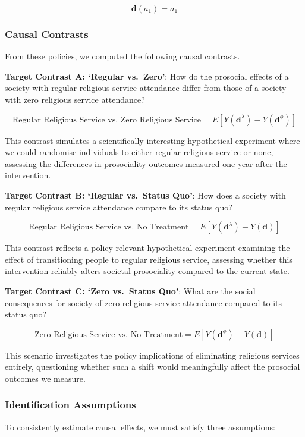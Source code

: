 \documentclass[
  single column]{article}
\begin{document}
\[
\mathbf{d}(a_1) = a_1
\]

\subsubsection{Causal Contrasts}\label{causal-contrasts}

From these policies, we computed the following causal contrasts.

\textbf{Target Contrast A: `Regular vs.~Zero'}: How do the prosocial
effects of a society with regular religious service attendance differ
from those of a society with zero religious service attendance?

\[ \text{Regular Religious Service vs. Zero Religious Service} = E[Y(\mathbf{d}^\lambda) - Y(\mathbf{d}^\phi)] \]

This contrast simulates a scientifically interesting hypothetical
experiment where we could randomise individuals to either regular
religious service or none, assessing the differences in prosociality
outcomes measured one year after the intervention.

\textbf{Target Contrast B: `Regular vs.~Status Quo'}: How does a society
with regular religious service attendance compare to its status quo?

\[ \text{Regular Religious Service vs. No Treatment} = E[Y(\mathbf{d}^\lambda) - Y(\mathbf{d})] \]

This contrast reflects a policy-relevant hypothetical experiment
examining the effect of transitioning people to regular religious
service, assessing whether this intervention reliably alters societal
prosociality compared to the current state.

\textbf{Target Contrast C: `Zero vs.~Status Quo'}: What are the social
consequences for society of zero religious service attendance compared
to its status quo?

\[ \text{Zero Religious Service vs. No Treatment} = E[Y(\mathbf{d}^\phi) - Y(\mathbf{d})] \]

This scenario investigates the policy implications of eliminating
religious services entirely, questioning whether such a shift would
meaningfully affect the prosocial outcomes we measure.

\subsubsection{Identification
Assumptions}\label{identification-assumptions}

To consistently estimate causal effects, we must satisfy three
assumptions:
\end{document}

